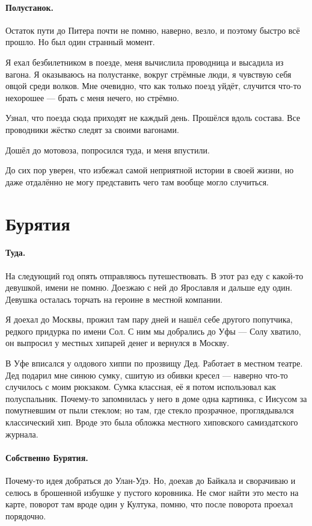 \documentclass{book}
\begin{document}
\paragraph{Полустанок.}
Остаток пути до Питера почти не помню, наверно, везло, и поэтому быстро всё прошло.
Но был один странный момент.

Я ехал безбилетником в поезде, меня вычислила проводница и высадила из вагона.
Я оказываюсь на полустанке, вокруг стрёмные люди, я чувствую себя овцой среди волков.
Мне очевидно, что как только поезд уйдёт, случится что-то нехорошее --- брать с меня нечего, но стрёмно.

Узнал, что поезда сюда приходят не каждый день.
Прошёлся вдоль состава.
Все проводники жёстко следят за своими вагонами.

Дошёл до мотовоза, попросился туда, и меня впустили.

До сих пор уверен, что избежал самой неприятной истории в своей жизни, но даже отдалённо не могу представить чего там вообще могло случиться.

\section*{Бурятия}

\paragraph{Туда.}
На следующий год опять отправляюсь путешествовать.
В этот раз еду с какой-то девушкой, имени не помню.
Доезжаю с ней до Ярославля и дальше еду один.
Девушка осталась торчать на героине в местной компании.

Я доехал до Москвы, прожил там пару дней и нашёл себе другого попутчика, редкого придурка по имени Сол.
С ним мы добрались до Уфы --- Солу хватило, он выпросил у местных хипарей денег и вернулся в Москву.

В Уфе вписался у олдового хиппи по прозвищу Дед.
Работает в местном театре.
Дед подарил мне синюю сумку, сшитую из обивки кресел --- наверно что-то случилось с моим рюкзаком.
Сумка классная, её я потом использовал как полуспальник.
Почему-то запомнилась у него в доме одна картинка, с Иисусом за помутневшим от пыли стеклом;
но там, где стекло прозрачное, проглядывался классический хип.
Вроде это была обложка местного хиповского самиздатского журнала.

\paragraph{Собственно Бурятия.}
Почему-то идея добраться до Улан-Удэ.
Но, доехав до Байкала и сворачиваю и селюсь в брошенной избушке у пустого коровника.
Не смог найти это место на карте, поворот там вроде один у Култука, помню, что после поворота проехал порядочно.
\end{document}
